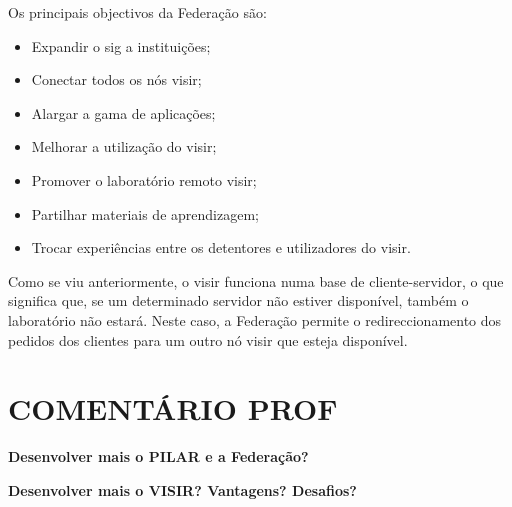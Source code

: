Os principais objectivos da Federação são\cite{visirfederation}:
\begin{itemize}
    \item Expandir o \acrshort{sig} a instituições;
    \item Conectar todos os nós \acrshort{visir};
    \item Alargar a gama de aplicações;
    \item Melhorar a utilização do \acrshort{visir};
    \item Promover o laboratório remoto \acrshort{visir};
    \item Partilhar materiais de aprendizagem;
    \item Trocar experiências entre os detentores e utilizadores do \acrshort{visir}.
\end{itemize}

Como se viu anteriormente, o \acrshort{visir} funciona numa base de cliente-servidor, o que significa que, se um determinado servidor não estiver disponível, também o laboratório não estará. Neste caso, a Federação permite o redireccionamento dos pedidos dos clientes para um outro nó \acrshort{visir} que esteja disponível\cite{kreiter}.

\section{COMENTÁRIO PROF}
\textbf{ Desenvolver mais o PILAR e a Federação?}

\textbf{Desenvolver mais o VISIR? Vantagens? Desafios?}